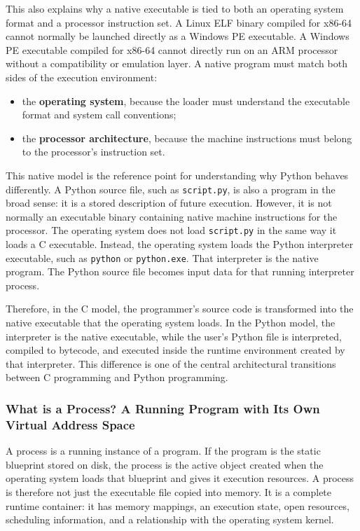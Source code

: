 \documentclass[a4paper,twoside]{report}
\begin{document}
This also explains why a native executable is tied to both an operating system format and a processor instruction set. A Linux ELF binary compiled for x86-64 cannot normally be launched directly as a Windows PE executable. A Windows PE executable compiled for x86-64 cannot directly run on an ARM processor without a compatibility or emulation layer. A native program must match both sides of the execution environment:

\begin{itemize}
    \item the \textbf{operating system}, because the loader must understand the executable format and system call conventions;
    \item the \textbf{processor architecture}, because the machine instructions must belong to the processor's instruction set.
\end{itemize}

This native model is the reference point for understanding why Python behaves differently. A Python source file, such as \texttt{script.py}, is also a program in the broad sense: it is a stored description of future execution. However, it is not normally an executable binary containing native machine instructions for the processor. The operating system does not load \texttt{script.py} in the same way it loads a C executable. Instead, the operating system loads the Python interpreter executable, such as \texttt{python} or \texttt{python.exe}. That interpreter is the native program. The Python source file becomes input data for that running interpreter process.

Therefore, in the C model, the programmer's source code is transformed into the native executable that the operating system loads. In the Python model, the interpreter is the native executable, while the user's Python file is interpreted, compiled to bytecode, and executed inside the runtime environment created by that interpreter. This difference is one of the central architectural transitions between C programming and Python programming.

\subsubsection{What is a Process? A Running Program with Its Own Virtual Address Space}

A process is a running instance of a program. If the program is the static blueprint stored on disk, the process is the active object created when the operating system loads that blueprint and gives it execution resources. A process is therefore not just the executable file copied into memory. It is a complete runtime container: it has memory mappings, an execution state, open resources, scheduling information, and a relationship with the operating system kernel.
\end{document}
